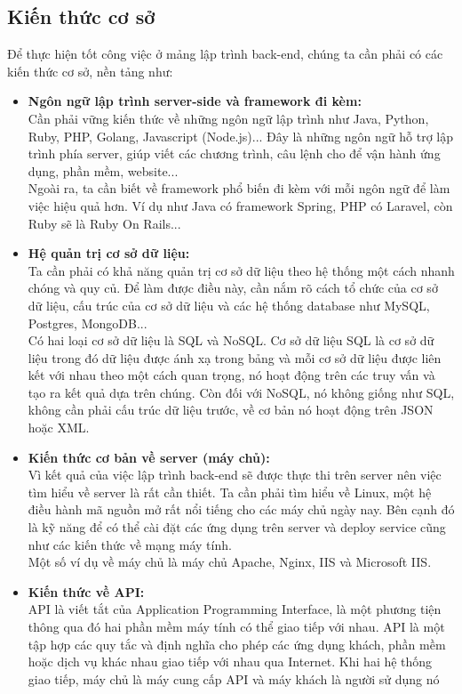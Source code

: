 \subsection{Kiến thức cơ sở}
\noindent Để thực hiện tốt công việc ở mảng lập trình back-end, chúng ta cần phải có các kiến thức cơ sở, nền
tảng như:
\begin{itemize}
  \item \textbf{Ngôn ngữ lập trình server-side và framework đi kèm:} \\[0.2cm]
  Cần phải vững kiến thức về những ngôn ngữ lập trình như Java, Python, Ruby, PHP, Golang,
  Javascript (Node.js)... Đây là những ngôn ngữ hỗ trợ lập trình phía server, giúp viết các chương
  trình, câu lệnh cho để vận hành ứng dụng, phần mềm, website...\\[0.2cm]
  Ngoài ra, ta cần biết về framework phổ biến đi kèm với mỗi ngôn ngữ để làm việc hiệu quả hơn. Ví
dụ như Java có framework Spring, PHP có Laravel, còn Ruby sẽ là Ruby On Rails...
  \item \textbf{Hệ quản trị cơ sở dữ liệu:}\\[0.2cm]
  Ta cần phải có khả năng quản trị cơ sở dữ liệu theo hệ thống một cách nhanh chóng và quy củ. Để
  làm được điều này, cần nắm rõ cách tổ chức của cơ sở dữ liệu, cấu trúc của cơ sở dữ liệu và các hệ
  thống database như MySQL, Postgres, MongoDB...\\[0.2cm]
  Có hai loại cơ sở dữ liệu là SQL và NoSQL. Cơ sở dữ liệu SQL là cơ sở dữ liệu trong đó dữ liệu
được ánh xạ trong bảng và mỗi cơ sở dữ liệu được liên kết với nhau theo một cách quan trọng, nó
hoạt động trên các truy vấn và tạo ra kết quả dựa trên chúng. Còn đối với NoSQL, nó không giống
như SQL, không cần phải cấu trúc dữ liệu trước, về cơ bản nó hoạt động trên JSON hoặc XML.
  \item \textbf{Kiến thức cơ bản về server (máy chủ):}\\[0.2cm]
  Vì kết quả của việc lập trình back-end sẽ được thực thi trên server nên việc tìm hiểu về server là
  rất cần thiết. Ta cần phải tìm hiểu về Linux, một hệ điều hành mã nguồn mở rất nổi tiếng cho
  các máy chủ ngày nay. Bên cạnh đó là kỹ năng để có thể cài đặt các ứng dụng trên server và deploy
  service cũng như các kiến thức về mạng máy tính.\\[0.2cm]
  Một số ví dụ về máy chủ là máy chủ Apache, Nginx, IIS và Microsoft IIS.
  \item \textbf{Kiến thức về API:}\\[0.2cm]
  API là viết tắt của Application Programming Interface, là một phương tiện thông qua đó hai phần
  mềm máy tính có thể giao tiếp với nhau. API là một tập hợp các quy tắc và định nghĩa cho phép
  các ứng dụng khách, phần mềm hoặc dịch vụ khác nhau giao tiếp với nhau qua Internet. Khi hai
  hệ thống giao tiếp, máy chủ là máy cung cấp API và máy khách là người sử dụng nó
\end{itemize}
